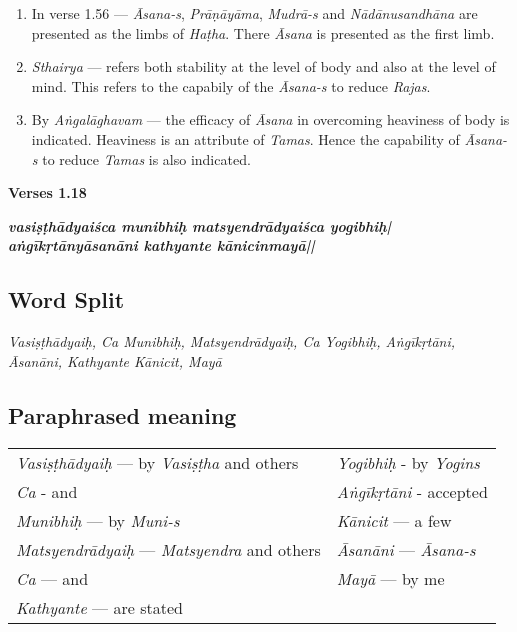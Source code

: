 \begin{enumerate}
\item In verse 1.56 --- \textit{Āsana-s}, \textit{Prāṇāyāma}, \textit{Mudrā-s} and \textit{Nādānusandhāna} are presented as the limbs of \textit{Haṭha}. There \textit{Āsana} is presented as the first limb. 
\item \textit{Sthairya} --- refers both stability at the level of body and also at the level of mind. This refers to the capabily of the \textit{Āsana-s} to reduce \textit{Rajas}.
\item By \textit{Aṅgalāghavam} --- the efficacy of \textit{Āsana} in overcoming heaviness of body is indicated. Heaviness is an attribute of \textit{Tamas}. Hence the capability of \textit{Āsana-s} to reduce \textit{Tamas} is also indicated. 
\end{enumerate}

\noindent \textbf{Verses 1.18}

\begin{shloka}
\textit{\textbf{vasiṣṭhādyaiśca munibhiḥ matsyendrādyaiśca yogibhiḥ|}\\
\textbf{aṅgīkṛtānyāsanāni kathyante kānicinmayā||}}
\end{shloka}


\subsection*{Word Split}

\textit{Vasiṣṭhādyaiḥ, Ca Munibhiḥ, Matsyendrādyaiḥ, Ca Yogibhiḥ, Aṅgīkṛtāni, Āsanāni, Kathyante Kānicit, Mayā}

\subsection*{Paraphrased meaning}

\begin{longtable}{>{\noindent\raggedright}p{5cm}>{\noindent\raggedright}p{5cm}}
\textit{Vasiṣṭhādyaiḥ} --- by \textit{Vasiṣṭha} and others & \textit{Yogibhiḥ} - by \textit{Yogins}\tabularnewline
\textit{Ca} - and & \textit{Aṅgīkṛtāni}  - accepted\tabularnewline
\textit{Munibhiḥ}  --- by \textit{Muni-s} & \textit{Kānicit} --- a few\tabularnewline
\textit{Matsyendrādyaiḥ} --- \textit{Matsyendra} and others & \textit{Āsanāni} --- \textit{Āsana-s}\tabularnewline
\textit{Ca}  --- and & \textit{Mayā} --- by me\tabularnewline
\textit{Kathyante} --- are stated & 
\end{longtable}


